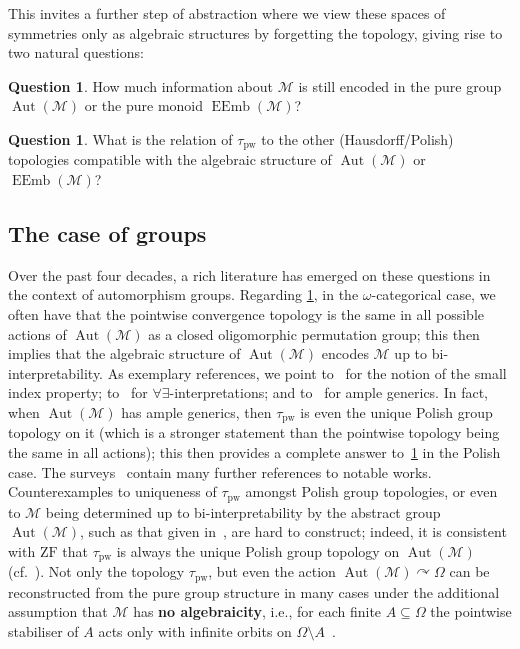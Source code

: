 \documentclass{article}
\theoremstyle{remark}
\theoremstyle{definition}
\newtheorem{question}[theorem]{Question}
\DeclareMathOperator{\Aut}{Aut}
\DeclareMathOperator{\EEmb}{EEmb}
\newcommand{\actson}{\curvearrowright}
\newcommand{\M}[0]{\mathcal{M}}
\newcommand{\pw}[0]{\tau_{\mathrm{pw}}}
\begin{document}
This invites a further step of abstraction where we view these spaces of symmetries only as algebraic structures by forgetting the topology, giving rise to two natural questions:
\begin{question}\label{q1} How much information about $\M$ is still encoded in the pure group $\Aut(\M)$ or the pure monoid $\EEmb(\M)$? 
\end{question}
\begin{question}\label{q2} What is the relation of $\pw$ to the other (Hausdorff/Polish) topologies compatible with the algebraic structure of $\Aut(\M)$ or $\EEmb(\M)$?
\end{question}

\subsection{The case of groups}

Over the past four decades, a rich literature has emerged on these questions in the context of automorphism groups.
 Regarding \cref{q1}, in the $\omega$-categorical case, {we often have that the pointwise convergence topology is the same in all possible actions of $\Aut(\M)$ as a closed oligomorphic permutation group; this then implies that the algebraic structure of $\Aut(\M)$ encodes $\M$ up to bi-interpretability.}
As exemplary references, we point to~\cite{DixonNeumannThomas, Truss} for the notion of the small index property; to~\cite{Rubin} for %
{$\forall\exists$}-interpretations; and to~\cite{HodgesHodkinsonLascarShelah, KechrisRosendal} for ample generics. {In fact, when $\Aut(\M)$ has ample generics, then $\pw$ is even the unique  Polish group topology on it (which is a stronger statement than the pointwise topology being the same in all actions); this then provides a complete answer to~\cref{q2} in the Polish case.} {The surveys~\cite{MacphersonSurvey, rosendal2025aspectsautomaticcontinuity} contain many further references to notable works.}  Counterexamples {to uniqueness of $\pw$ amongst Polish group topologies, or even to $\M$ being determined up to bi-interpretability by the abstract group $\Aut(\M)$}, such as that given in~\cite{EvansHewitt}, are hard to construct; indeed, it is consistent with $\mathrm{ZF}$ that $\pw$ is always the unique Polish group topology on $\Aut(\M)$~\cite{Lascar} (cf.~\cite{solovay1970model, shelah1984can}). {Not only the topology $\pw$, but} even the action $\Aut(\M)\actson \Omega$ can be reconstructed from the pure group structure in many cases under the additional assumption that $\M$ has \textbf{no algebraicity}, i.e., for each finite $A\subseteq \Omega$ the pointwise stabiliser of $A$ acts only with infinite orbits on $\Omega\setminus A$~\cite{Rubin}.\\
\end{document}

